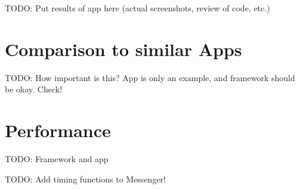 TODO: Put results of app here (actual screenshots, review of code, etc.)

\section{Comparison to similar Apps}

TODO: How important is this?
App is only an example, and framework should be okay.
Check!

\section{Performance}

TODO: Framework and app

TODO: Add timing functions to Messenger!
